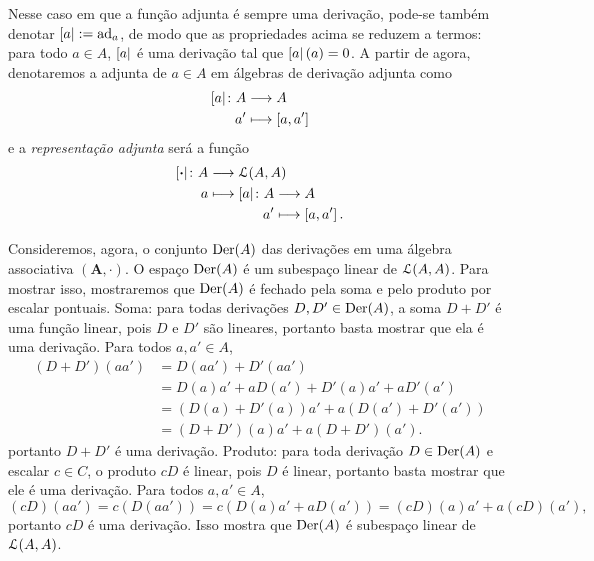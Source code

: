 Nesse caso em que a função adjunta é sempre uma derivação, pode-se também denotar $\left[{a}\right| := \operatorname{ad}_a$, de modo que as propriedades acima se reduzem a termos: para todo $a \in A$, $\left[{a}\right|$ é uma derivação tal que $\left[{a}\right|(a)=0$. A partir de agora, denotaremos a adjunta de $a \in A$ em álgebras de derivação adjunta como
	\begin{align*}
	{\left[{a}\right|}\colon {A} &\longrightarrow {A} \\{a'} &\longmapsto \left[{a},{a'}\right]
	\end{align*}
e a \emph{representação adjunta} será a função
	\begin{align*}
	\func{\ad{\var}}{A}{\lin(A,A)}{a}{
		\begin{aligned}[t]
		\func{\ad{a}}{A}{A}{a'}{\col{a}{a'}}.
		\end{aligned}
	}
	\end{align*}


Consideremos, agora, o conjunto $\operatorname{Der}(A)$ das derivações em uma álgebra associativa $(\bm A, \cdot)$. O espaço $\operatorname{Der}(A)$ é um subespaço linear de $\mathcal{L}(A,A)$. Para mostrar isso, mostraremos que $\operatorname{Der}(A)$ é fechado pela soma e pelo produto por escalar pontuais. Soma: para todas derivações $D,D' \in \operatorname{Der}(A)$, a soma $D+D'$ é uma função linear, pois $D$ e $D'$ são lineares, portanto basta mostrar que ela é uma derivação. Para todos $a,a' \in A$,
	\begin{align*}
	(D+D')(aa') &= D(aa') + D'(aa') \\
		&= D(a)a' + aD(a') + D'(a)a' + aD'(a') \\
		&= (D(a)+D'(a))a' + a(D(a')+D'(a')) \\
		&= (D+D')(a)a' + a(D+D')(a').
	\end{align*}
portanto $D+D'$ é uma derivação. Produto: para toda derivação $D \in \operatorname{Der}(A)$ e escalar $c \in C$, o produto $cD$ é linear, pois $D$ é linear, portanto basta mostrar que ele é uma derivação. Para todos $a,a' \in A$,
	\begin{equation*}
	(cD)(aa') = c(D(aa')) = c(D(a)a' + aD(a')) = (cD)(a)a' + a(cD)(a'),
	\end{equation*}
portanto $cD$ é uma derivação. Isso mostra que $\operatorname{Der}(A)$ é subespaço linear de $\mathcal{L}(A,A)$.

